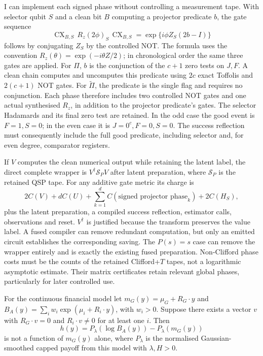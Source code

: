 I can implement each signed phase without controlling a measurement
tape. With selector qubit $S$ and a clean bit $B$ computing a projector
predicate $b$, the gate sequence
\[
 \operatorname{CX}_{B,S}\,R_z(2\phi)_S\,
 \operatorname{CX}_{B,S}
 =\exp\{i\phi Z_S(2b-I)\}
\]
follows by conjugating $Z_S$ by the controlled NOT. The formula uses
the convention $R_z(\theta)=\exp(-i\theta Z/2)$; in chronological
order the same three gates are applied. For $\Pi$, $b$ is the
conjunction of the $c+1$ zero tests on $J,F$. A clean chain computes
and uncomputes this predicate using $2c$ exact Toffolis and
$2(c+1)$ NOT gates. For $\widetilde\Pi$, the predicate is the
single flag and requires no conjunction. Each phase therefore includes
two controlled NOT gates and one actual synthesised $R_z$, in addition
to the projector predicate's gates. The selector Hadamards and its
final zero test are retained. In the odd case the good event is
$F=1,S=0$; in the even case it is $J=0^c,F=0,S=0$.
The success reflection must consequently include the full good predicate,
including selector and, for even degree, comparator registers.

If $V$ computes the clean numerical output while retaining the latent
label, the direct complete wrapper is $V^\dagger\mathcal S_PV$ after
latent preparation, where $\mathcal S_P$ is the retained QSP tape.
For any additive gate metric its charge is
\[
 2C(V)+dC(U)+\sum_{k=1}^d C(\text{signed projector phase}_k)
       +2C(H_S),
\]
plus the latent preparation, a compiled success reflection, estimator
calls, observations and reset. $V^\dagger$ is justified because the
transform preserves the value label. A fused compiler can remove
redundant computation, but only an emitted circuit establishes the
corresponding saving. The $P(s)=s$ case can remove the wrapper entirely
and is exactly the existing fused preparation. Non-Clifford phase costs
must be the counts of the retained Clifford+$T$ tapes, not a logarithmic
asymptotic estimate. Their matrix certificates retain relevant global
phases, particularly for later controlled use.

\begin{proposition}
\label{prop:qsp-geometric-scalar-obstruction}
For the continuous financial model let
$m_G(y)=\mu_G+R_G\cdot y$ and
$B_A(y)=\sum_iw_i\exp(\mu_i+R_i\cdot y)$, with $w_i>0$.
Suppose there exists a vector $v$ with $R_G\cdot v=0$ and
$R_i\cdot v\ne0$ for at least one $i$. Then
\[
 h(y)=P_\lambda(\log B_A(y))-P_\lambda(m_G(y))
\]
is not a function of $m_G(y)$ alone, where $P_\lambda$ is the normalised
Gaussian-smoothed capped payoff from this model with $\lambda,H>0$.
\end{proposition}

